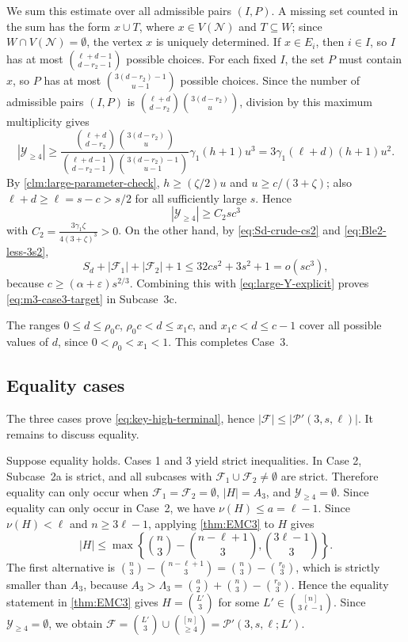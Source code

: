 \documentclass[10pt,a4paper]{article}
\numberwithin{equation}{section}
\theoremstyle{definition}
\newcommand{\F}{\mathcal F}
\newcommand{\Y}{\mathcal Y}
\begin{document}
We sum this estimate over all admissible pairs $(I,P)$. A missing set counted in the sum has the form $x\cup T$, where $x\in V(\mathcal N)$ and $T\subseteq W$; since $W\cap V(\mathcal N)=\emptyset$, the vertex $x$ is uniquely determined. If $x\in E_i$, then $i\in I$, so $I$ has at most $\binom{\ell+d-1}{d-r_2-1}$ possible choices. For each fixed $I$, the set $P$ must contain $x$, so $P$ has at most $\binom{3(d-r_2)-1}{u-1}$ possible choices. Since the number of admissible pairs $(I,P)$ is $\binom{\ell+d}{d-r_2}\binom{3(d-r_2)}u$, division by this maximum multiplicity gives
\[
        |\Y_{\ge4}|
        \ge
        \frac{\binom{\ell+d}{d-r_2}\binom{3(d-r_2)}u}
        {\binom{\ell+d-1}{d-r_2-1}\binom{3(d-r_2)-1}{u-1}}
        \gamma_1(h+1)u^3
        =
        3\gamma_1(\ell+d)(h+1)u^2.
\]
By \cref{clm:large-parameter-check}, $h\ge(\zeta/2)u$ and $u\ge c/(3+\zeta)$; also $\ell+d\ge\ell=s-c>s/2$ for all sufficiently large $s$. Hence
\begin{equation}\label{eq:large-Y-explicit}
        |\Y_{\ge4}|
        \ge C_2sc^3
\end{equation}
with $C_2=\frac{3\gamma_1\zeta}{4(3+\zeta)^3}>0$.
On the other hand, by \eqref{eq:Sd-crude-cs2} and \eqref{eq:Ble2-less-3s2},
\[
        S_d+|\F_1|+|\F_2|+1\le32cs^2+3s^2+1=o(sc^3),
\]
because $c\ge(\alpha+\varepsilon)s^{2/3}$. Combining this with \eqref{eq:large-Y-explicit} proves \eqref{eq:m3-case3-target} in Subcase~3c.

The ranges $0\le d\le\rho_0 c$, $\rho_0 c<d\le x_1c$, and $x_1c<d\le c-1$ cover all possible values of $d$, since $0<\rho_0<x_1<1$.
This completes Case~3.


\subsection{Equality cases}


The three cases prove \eqref{eq:key-high-terminal}, hence $|\F|\le|\mathcal P'(3,s,\ell)|$.
It remains to discuss equality.

Suppose equality holds.
Cases 1 and 3 yield strict inequalities.
In Case 2, Subcase~2a is strict, and all subcases with $\F_1\cup\F_2\ne\emptyset$ are strict.
Therefore equality can only occur when $\F_1=\F_2=\emptyset$, $|H|=A_3$, and $\Y_{\ge4}=\emptyset$.
Since equality can only occur in Case~2, we have $\nu(H)\le a=\ell-1$.
Since $\nu(H)<\ell$ and $n\ge3\ell-1$, applying \cref{thm:EMC3} to $H$ gives
\[
        |H|\le
        \max\left\{\binom n3-\binom{n-\ell+1}{3},\binom{3\ell-1}{3}\right\}.
\]
The first alternative is $\binom n3-\binom{n-\ell+1}{3}=\binom n3-\binom{r_0}{3}$, which is strictly smaller than $A_3$, because $A_3>\Lambda_3=\binom a2+\binom n3-\binom{r_0}{3}$.
Hence the equality statement in \cref{thm:EMC3} gives $H=\binom{L'}3$ for some $L'\in\binom{[n]}{3\ell-1}$.
Since $\Y_{\ge4}=\emptyset$, we obtain $\F=\binom{L'}3\cup\binom{[n]}{\ge4}=\mathcal P'(3,s,\ell;L')$.
\end{document}

